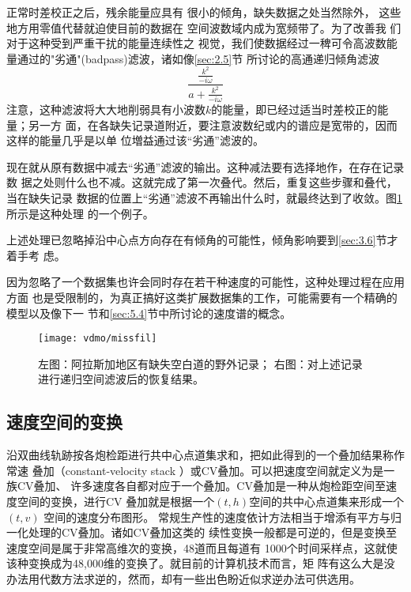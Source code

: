 正常时差校正之后，残余能量应具有
很小的倾角，缺失数据之处当然除外，
这些地方用零值代替就迫使目前的数据在
空间波数域内成为宽频带了。为了改善我
们对于这种受到严重干扰的能量连续性之
视觉，我们使数据经过一稗可令高波数能量通过的"劣通"(badpass)滤波，诸如像\ref{sec:2.5}节
所讨论的高通递归倾角滤波
\begin{equation}
\frac{\frac{k^2}{-i\omega}}{a+\frac{k^2}{-i\omega}}
\label{eq:ex3.5.6}
\end{equation}
注意，这种滤波将大大地削弱具有小波数$k$的能量，即已经过适当时差校正的能量；另一方
面，在各缺失记录道附近，要注意波数纪或内的谱应是宽带的，因而这样的能量几乎是以单
位増益通过该“劣通”滤波的。

现在就从原有数据中减去“劣通”滤波的输出。这种减法要有选择地作，在存在记录数
据之处则什么也不减。这就完成了第一次叠代。然后，重复这些步骤和叠代，当在缺失记录
数据的位置上“劣通”滤波不再输出什么时，就最终达到了收敛。图\ref{fig:vdmo/missfil}所示是这种处理
的一个例子。

上述处理已忽略掉沿中心点方向存在有倾角的可能性，倾角影响要到\ref{sec:3.6}节才着手考
虑。

因为忽略了一个数据集也许会同时存在若干种速度的可能性，这种处理过程在应用方面
也是受限制的，为真正搞好这类扩展数据集的工作，可能需要有一个精确的模型以及像下一
节和\ref{sec:5.4}节中所讨论的速度谱的概念。

\begin{figure}[H]
\centering
\texttt{[image: vdmo/missfil]}
\caption[missfil]{左图：阿拉斯加地区有缺失空白道的野外记录；
右图：对上述记录进行递归空间滤波后的恢复结果。}
\label{fig:vdmo/missfil}
\end{figure}

\subsection{速度空间的变换}
\label{sec:3.5.7}

沿双曲线轨跡按各炮检距进行共中心点道集求和，把如此得到的一个叠加结果称作常速
叠加（constant-velocity stack
）或CV叠加。可以把速度空间就定义为是一族CV叠加、
许多速度各自都对应于一个叠加。CV叠加是一种从炮检距空间至速度空间的变换，进行CV
叠加就是根据一个$(t,h)$空间的共中心点道集来形成一个$(t,v)$
空间的速度分布图形。
常规生产性的速度依计方法相当于增添有平方与归一化处理的CV叠加。诸如CV叠加这类的
续性变换一般都是可逆的，但是变换至速度空间是属于非常高维次的变换，48道而且每道有
1000个时间采样点，这就使该种变换成为48,000维的变换了。就目前的计算机技术而言，矩
阵有这么大是没办法用代数方法求逆的，然而，却有一些出色盼近似求逆办法可供选用。

